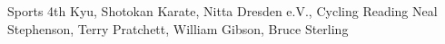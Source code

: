   \begin{cvskills} 
     	 \cvskill
      		{Sports}
		{4th Kyu, Shotokan Karate, Nitta Dresden e.V., Cycling}
	 \cvskill
		{Reading}
		{Neal Stephenson, Terry Pratchett, William Gibson, Bruce
		Sterling}
  \end{cvskills}
